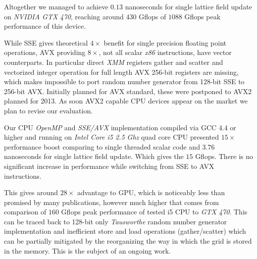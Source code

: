 \documentclass[11pt,a4paper]{article}
\begin{document}
Altogether we managed to achieve $0.13$ nanoseconds for single lattice
field update on \emph{NVIDIA GTX 470}, reaching around $430$ Gflops of
$1088$ Gflops peak performance of this device. 


While SSE gives theoretical $4\times$ benefit for single precision
floating point operations, AVX providing $8\times$, not all scalar
\emph{x86} instructions, have vector counterparts.  In particular
direct \emph{XMM} registers gather and scatter and vectorized integer
operation for full length AVX 256-bit registers are missing, which makes
impossible to port random number generator from 128-bit SSE to 256-bit
AVX. Initially planned for AVX standard, these were postponed to AVX2
planned for 2013. As soon AVX2 capable CPU devices appear on the market
we plan to revise our evaluation.


Our CPU \emph{OpenMP} and \emph{SSE/AVX} implementation compiled via
GCC 4.4 or higher and running on \emph{Intel Core i5 2.5 Ghz} quad
core CPU presented $15\times$ performance boost comparing to single
threaded scalar code and $3.76$ nanoseconds for single lattice field
update.  Which gives the $15$ Gflops. There is no significant increase
in performance while switching from SSE to AVX instructions.

\newpage

This gives around $28\times$ advantage to GPU, which is noticeably
less than promised by many publications, however much higher that
comes from comparison of $160$ Gflops peak performance of tested i5
CPU to \emph{GTX 470}\cite{Lee:2010:DGV:1816038.1816021}. This can be
traced back to 128-bit only \emph{Tausworthe} random number generator
implementation and inefficient store and load operations
(gather/scatter) which can be partially mitigated by the reorganizing
the way in which the grid is stored in the memory. This is the subject
of an ongoing work.

{}

\end{document}
